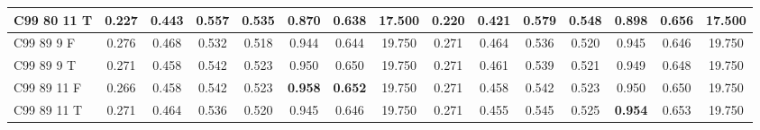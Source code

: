 \documentclass{article}
\begin{document}
\begin{longtable}[c]{|l|c|c|c|c|c|c|c||c|c|c|c|c|c|c|}
C99 80 11 T & 0.227 & 0.443 & 0.557 & 0.535 & 0.870 & 0.638 & 17.500 & 0.220 & 0.421 & 0.579 & 0.548 & 0.898 & \textbf{0.656} & 17.500\\ \hline
C99 89  9 F & 0.276 & 0.468 & 0.532 & 0.518 & 0.944 & 0.644 & 19.750 & 0.271 & 0.464 & 0.536 & 0.520 & 0.945 & 0.646 & 19.750\\ \hline
C99 89  9 T & 0.271 & 0.458 & 0.542 & 0.523 & 0.950 & 0.650 & 19.750 & 0.271 & 0.461 & 0.539 & 0.521 & 0.949 & 0.648 & 19.750\\ \hline
C99 89 11 F & 0.266 & 0.458 & 0.542 & 0.523 & \textbf{0.958} & \textbf{0.652} & 19.750 & 0.271 & 0.458 & 0.542 & 0.523 & 0.950 & 0.650 & 19.750\\ \hline
C99 89 11 T & 0.271 & 0.464 & 0.536 & 0.520 & 0.945 & 0.646 & 19.750 & 0.271 & 0.455 & 0.545 & 0.525 & \textbf{0.954} & 0.653 & 19.750\\ \hline
\end{longtable} 
\end{document}
